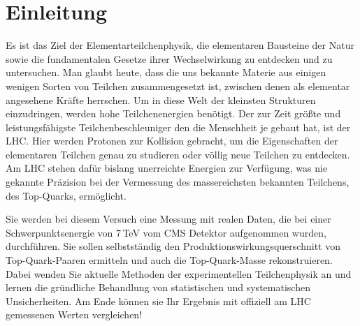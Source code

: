 \section{Einleitung}
\label{intro}
Es ist das Ziel der Elementarteilchenphysik, die elementaren Bausteine der Natur sowie die fundamentalen Gesetze ihrer Wechselwirkung zu entdecken und zu untersuchen.
 Man glaubt heute, dass die uns bekannte Materie aus einigen wenigen Sorten von Teilchen zusammengesetzt ist, zwischen denen als elementar angesehene Kr\"afte herrschen.
 Um in diese Welt der kleinsten Strukturen einzudringen, werden hohe Teilchenenergien ben\"otigt. Der zur Zeit gr\"o\ss te und leistungsf\"ahigste Teilchenbeschleuniger den die
 Menschheit je gebaut hat, ist der LHC. Hier werden Protonen zur Kollision gebracht, um die Eigenschaften der elementaren Teilchen genau zu studieren oder v\"ollig neue 
 Teilchen zu entdecken. Am LHC stehen daf\"ur bislang unerreichte Energien zur Verf\"ugung, was nie gekannte Pr\"azision bei der Vermessung des massereichsten bekannten Teilchens,
 des Top-Quarks, erm\"oglicht. 

Sie werden bei diesem Versuch eine Messung mit realen Daten, die bei einer Schwerpunktsenergie von 7\,TeV vom CMS Detektor aufgenommen wurden, durchf\"uhren.
 Sie sollen selbstst\"andig den Produktionswirkungsquerschnitt von Top-Quark-Paaren ermitteln und auch die Top-Quark-Masse rekonstruieren.
 Dabei wenden Sie aktuelle Methoden der experimentellen Teilchenphysik an und lernen die gr\"undliche Behandlung von statistischen und systematischen Unsicherheiten.
 Am Ende k\"onnen sie Ihr Ergebnis mit offiziell am LHC gemessenen Werten vergleichen!

